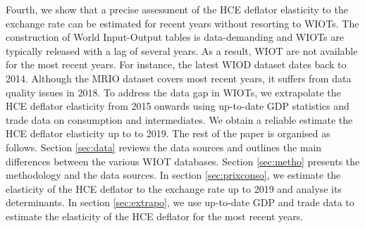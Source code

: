 \documentclass[11pt,a4paper]{paper} %
\begin{document}
Fourth, we show that a precise assessment of the HCE deflator elasticity to the exchange rate can be estimated for recent years without resorting to WIOTs. 
The construction of World Input-Output tables is data-demanding and WIOTs are typically released with a lag of several years.
As a result, WIOT are not available for the most recent years. For instance, the latest WIOD dataset dates back to 2014. 
Although the MRIO dataset covers most recent years, it suffers from data quality issues in 2018. 
To address the data gap in WIOTs, we extrapolate the HCE deflator elasticity from 2015 onwards using up-to-date GDP statistics and trade data on consumption and intermediates.
We obtain a reliable estimate the HCE deflator elasticity up to to 2019.
The rest of the paper is organised as follows.
Section \ref{sec:data} reviews the data sources and outlines the main differences between the various WIOT databases.
Section \ref{sec:metho} presents the methodology and the data sources.
In section \ref{sec:prixconso}, we estimate the elasticity of the HCE deflator to the exchange rate up to 2019 and analyse its determinants.
In section \ref{sec:extrapo}, we use up-to-date GDP and trade data to estimate the elasticity of the HCE deflator for the most recent years.


\end{document}

